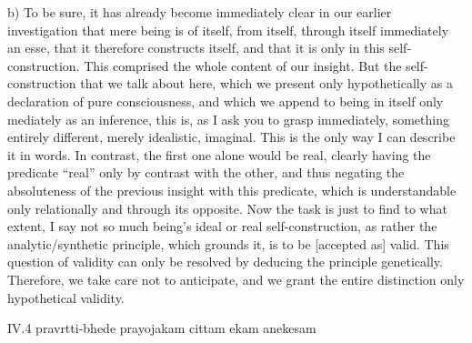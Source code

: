 b) To be sure, it has already become immediately clear
in our earlier investigation that mere being is
of itself, from itself, through itself immediately an esse,
that it therefore constructs itself,
and that it is only in this self-construction.
This comprised the whole content of our insight.
But the self-construction that we talk about here,
which we present only hypothetically as
a declaration of pure consciousness,
and which we append to being in itself
only mediately as an inference,
this is, as I ask you to grasp immediately,
something entirely different, merely idealistic, imaginal.
This is the only way I can describe it in words.
In contrast, the first one alone would be real,
clearly having the predicate “real”
only by contrast with the other,
and thus negating the absoluteness of
the previous insight with this predicate,
which is understandable only relationally
and through its opposite.
Now the task is just to find to what extent,
I say not so much being's ideal or real self-construction,
as rather the analytic/synthetic principle,
which grounds it, is to be [accepted as] valid.
This question of validity can only be resolved
by deducing the principle genetically.
Therefore, we take care not to anticipate,
and we grant the entire distinction
only hypothetical validity.

IV.4
pravrtti-bhede prayojakam cittam ekam anekesam

